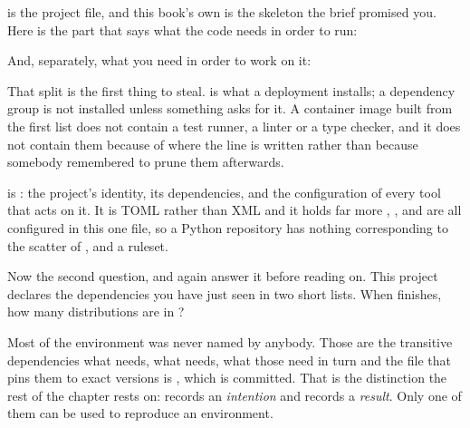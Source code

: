 \noindent
{} is the project file, and this book's own is the skeleton
the brief promised you. Here is the part that says what the code needs in order
to run:


\noindent
And, separately, what you need in order to work on it:


\noindent
That split is the first thing to steal.  is what
a deployment installs; a dependency group is not installed unless something
asks for it. A container image built from the first list does not contain a
test runner, a linter or a type checker, and it does not contain them because
of where the line is written rather than because somebody remembered to prune
them afterwards.

\begin{csbox}
 is : the project's identity, its
dependencies, and the configuration of every tool that acts on it. It is TOML
rather than XML and it holds far more \dash{} , ,
 and  are all configured in this one file, so a Python
repository has nothing corresponding to the scatter of
,  and a ruleset.
\end{csbox}

\noindent
Now the second question, and again answer it before reading on. This project
declares the dependencies you have just seen in two short lists. When
 finishes, how many distributions are in ?



\noindent
Most of the environment was never named by anybody. Those are the transitive
dependencies \dash{} what  needs, what  needs,
what those need in turn \dash{} and the file that pins them to exact versions
is , which is committed. That is the distinction the rest of the
chapter rests on:  records an \emph{intention} and
 records a \emph{result}. Only one of them can be used to
reproduce an environment.

